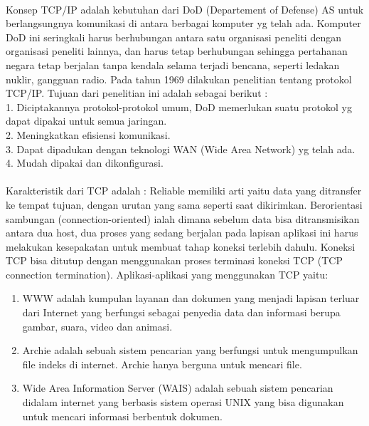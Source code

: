 \paragraph{}
\hspace{1cm}
Konsep TCP/IP adalah kebutuhan dari DoD (Departement of Defense) AS untuk berlangsungnya komunikasi di antara berbagai komputer yg telah ada. Komputer DoD ini seringkali harus berhubungan antara satu organisasi peneliti dengan organisasi peneliti lainnya, dan harus tetap berhubungan sehingga pertahanan negara tetap berjalan tanpa kendala selama terjadi bencana, seperti ledakan nuklir, gangguan radio. Pada tahun 1969 dilakukan penelitian tentang protokol TCP/IP. Tujuan dari penelitian ini adalah sebagai berikut :\\
1.	Diciptakannya protokol-protokol umum, DoD memerlukan suatu protokol yg dapat dipakai untuk semua jaringan. \\
2.	Meningkatkan efisiensi komunikasi. \\
3.	Dapat dipadukan dengan teknologi WAN (Wide Area Network) yg telah ada. \\
4.	Mudah dipakai dan dikonfigurasi. \\


\paragraph{}
\hspace{1cm}
Karakteristik dari TCP adalah :
Reliable memiliki arti yaitu data yang ditransfer ke tempat tujuan,  dengan urutan yang sama seperti saat dikirimkan.
Berorientasi sambungan (connection-oriented) ialah dimana sebelum data bisa ditransmisikan antara dua host, dua proses yang sedang berjalan pada lapisan aplikasi ini harus melakukan kesepakatan untuk membuat tahap koneksi terlebih dahulu. Koneksi TCP bisa ditutup dengan menggunakan proses terminasi koneksi TCP (TCP connection termination). Aplikasi-aplikasi yang menggunakan TCP yaitu:

\begin{enumerate}
\item WWW adalah kumpulan layanan dan dokumen yang menjadi lapisan terluar dari Internet yang berfungsi sebagai penyedia data dan informasi berupa gambar, suara, video dan animasi. 
\item Archie adalah sebuah sistem pencarian  yang berfungsi untuk mengumpulkan file indeks di internet. Archie hanya berguna untuk mencari file. 
\item Wide Area Information Server (WAIS) adalah sebuah sistem pencarian didalam internet yang berbasis sistem operasi UNIX yang bisa digunakan untuk mencari informasi berbentuk dokumen.\\
\end{enumerate}
